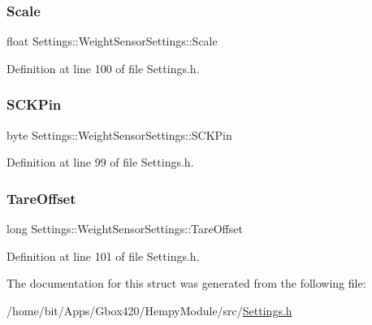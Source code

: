\subsubsection{\texorpdfstring{Scale}{Scale}}
{\footnotesize\ttfamily float Settings\+::\+Weight\+Sensor\+Settings\+::\+Scale}



Definition at line 100 of file Settings.\+h.

\mbox{\label{struct_settings_1_1_weight_sensor_settings_a07dc605f30f893853253191cbd167357}} 
\subsubsection{\texorpdfstring{S\+C\+K\+Pin}{SCKPin}}
{\footnotesize\ttfamily byte Settings\+::\+Weight\+Sensor\+Settings\+::\+S\+C\+K\+Pin}



Definition at line 99 of file Settings.\+h.

\mbox{\label{struct_settings_1_1_weight_sensor_settings_af22f3736de063e3d85e202058e0b69a0}} 
\subsubsection{\texorpdfstring{Tare\+Offset}{TareOffset}}
{\footnotesize\ttfamily long Settings\+::\+Weight\+Sensor\+Settings\+::\+Tare\+Offset}



Definition at line 101 of file Settings.\+h.



The documentation for this struct was generated from the following file\+:\begin{DoxyCompactItemize}
\item 
/home/bit/\+Apps/\+Gbox420/\+Hempy\+Module/src/\hyperlink{_hempy_module_2src_2_settings_8h}{Settings.\+h}\end{DoxyCompactItemize}
